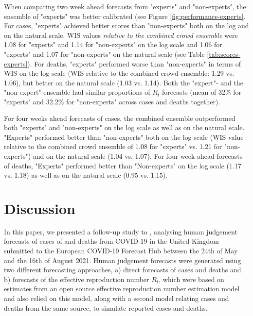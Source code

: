 \documentclass[10pt,a4paper,twocolumn]{article}
\providecommand{\DIFaddtex}[1]{{\protect\color{blue}\uwave{#1}}} %
\providecommand{\DIFaddbegin}{} %
\providecommand{\DIFaddend}{} %
\providecommand{\DIFadd}[1]{\texorpdfstring{\DIFaddtex{#1}}{#1}} %
\begin{document}
\DIFaddend When comparing two week ahead forecasts from "experts" and "non-experts", the ensemble of "experts" was better calibrated (see Figure \ref{fig:performance-experts}\DIFaddbegin \DIFadd{)}\DIFaddend . For cases, "experts" achieved better scores than "non-experts" both on the log and on the natural scale. WIS values \textit{relative to the combined crowd ensemble} were 1.08 for "experts" and 1.14 for "non-experts" on the log scale and 1.06 for "experts" and 1.07 for "non-experts" on the natural scale (see Table \ref{tab:scores-experts}).  
For deaths, "experts" performed worse than "non-experts" in terms of WIS on the log scale (WIS relative to the combined crowd ensemble: 1.29 vs. 1.06), but better on the natural scale (1.03 vs. 1.14). Both the "expert"- and the "non-expert"-ensemble had similar proportions of $R_t$ forecasts (mean of 32\% for "experts" and 32.2\% for "non-experts" across cases and deaths together). 

For four weeks ahead forecasts of cases, the combined ensemble outperformed both "experts" and "non-experts" on the log scale as well as on the natural scale. "Experts" performed better than "non-experts" both on the log scale (WIS value relative to the combined crowd ensemble of 1.08 for "experts" vs. 1.21 for "non-experts") and on the natural scale (1.04 vs. 1.07). For four week ahead forecasts of deaths, "Experts" performed better than "Non-experts" on the log scale (1.17 vs. 1.18) as well as on the natural scale (0.95 vs. 1.15). 

\section*{Discussion}

In this paper, we presented a follow-up study to \cite{bosseComparingHumanModelbased2022}, analysing human judgement forecasts of cases of and deaths from COVID-19 in the United Kingdom submitted to the European COVID-19 Forecast Hub between the 24th of May and the 16th of August 2021. Human judgement forecasts were generated using two different forecasting approaches, a) direct forecasts of cases and deaths and b) forecasts of the effective reproduction number $R_t$, which were based on estimates from an open source effective reproduction number estimation model and also relied on this model, along with a second model relating cases and deaths from the same source, to simulate reported cases and deaths. 
\end{document}
